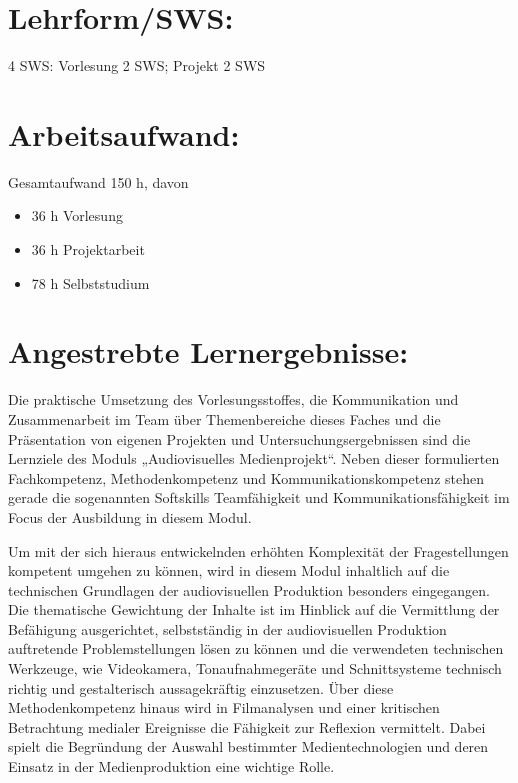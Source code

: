 \section*{Lehrform/SWS:}\label{lehrformsws-2}

4 SWS: Vorlesung 2 SWS; Projekt 2 SWS

\section*{Arbeitsaufwand:}\label{arbeitsaufwand-2}

Gesamtaufwand 150 h, davon

\begin{itemize}
\item
  36 h Vorlesung
\item
  36 h Projektarbeit
\item
  78 h Selbststudium
\end{itemize}

\section*{Angestrebte
Lernergebnisse:}\label{angestrebte-lernergebnisse-2}

Die praktische Umsetzung des Vorlesungsstoffes, die Kommunikation und
Zusammenarbeit im Team über Themenbereiche dieses Faches und die
Präsentation von eigenen Projekten und Untersuchungsergebnissen sind die
Lernziele des Moduls „Audiovisuelles Medienprojekt``. Neben dieser
formulierten Fachkompetenz, Methodenkompetenz und
Kommunikationskompetenz stehen gerade die sogenannten Softskills
Teamfähigkeit und Kommunikationsfähigkeit im Focus der Ausbildung in
diesem Modul.

Um mit der sich hieraus entwickelnden erhöhten Komplexität der
Fragestellungen kompetent umgehen zu können, wird in diesem Modul
inhaltlich auf die technischen Grundlagen der audiovisuellen Produktion
besonders eingegangen. Die thematische Gewichtung der Inhalte ist im
Hinblick auf die Vermittlung der Befähigung ausgerichtet, selbstständig
in der audiovisuellen Produktion auftretende Problemstellungen lösen zu
können und die verwendeten technischen Werkzeuge, wie Videokamera,
Tonaufnahmegeräte und Schnittsysteme technisch richtig und gestalterisch
aussagekräftig einzusetzen. Über diese Methodenkompetenz hinaus wird in
Filmanalysen und einer kritischen Betrachtung medialer Ereignisse die
Fähigkeit zur Reflexion vermittelt. Dabei spielt die Begründung der
Auswahl bestimmter Medientechnologien und deren Einsatz in der
Medienproduktion eine wichtige Rolle.

